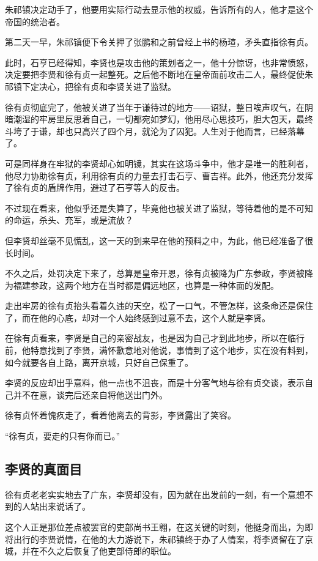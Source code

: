 \begin{multicols}{\theparacolNo}
		朱祁镇决定动手了，他要用实际行动去显示他的权威，告诉所有的人，他才是这个帝国的统治者。

		第二天一早，朱祁镇便下令关押了张鹏和之前曾经上书的杨瑄，矛头直指徐有贞。

		此时，石亨已经得知，李贤也是攻击他的策划者之一，他十分惊讶，也非常愤怒，决定要把李贤和徐有贞一起整死。之后他不断地在皇帝面前攻击二人，最终促使朱祁镇下定决心，把徐有贞和李贤关进了监狱。

		徐有贞彻底完了，他被关进了当年于谦待过的地方——诏狱，整日唉声叹气，在阴暗潮湿的牢房里反思着自己，一切都宛如梦幻，他用尽心思技巧，胆大包天，最终斗垮了于谦，却也只高兴了四个月，就沦为了囚犯。人生对于他而言，已经落幕了。

		可是同样身在牢狱的李贤却心如明镜，其实在这场斗争中，他才是唯一的胜利者，他尽力协助徐有贞，利用徐有贞的力量去打击石亨、曹吉祥。此外，他还充分发挥了徐有贞的盾牌作用，避过了石亨等人的反击。

		不过现在看来，他似乎还是失算了，毕竟他也被关进了监狱，等待着他的是不可知的命运，杀头、充军，或是流放？

		但李贤却丝毫不见慌乱，这一天的到来早在他的预料之中，为此，他已经准备了很长时间。

		不久之后，处罚决定下来了，总算是皇帝开恩，徐有贞被降为广东参政，李贤被降为福建参政，这两个地方在当时都是偏远地区，也算是一种体面的发配。

		走出牢房的徐有贞抬头看着久违的天空，松了一口气，不管怎样，这条命还是保住了，而在他的心底，却对一个人始终感到过意不去，这个人就是李贤。

		在徐有贞看来，李贤是自己的亲密战友，也是因为自己才到此地步，所以在临行前，他特意找到了李贤，满怀歉意地对他说，事情到了这个地步，实在没有料到，如今就要各自上路，离开京城，只好自己保重了。

		李贤的反应却出乎意料，他一点也不沮丧，而是十分客气地与徐有贞交谈，表示自己并不在意，谈完后还亲自将他送出门外。

		徐有贞怀着愧疚走了，看着他离去的背影，李贤露出了笑容。

		“徐有贞，要走的只有你而已。”

		\subsection{李贤的真面目}
		徐有贞老老实实地去了广东，李贤却没有，因为就在出发前的一刻，有一个意想不到的人站出来说话了。

		这个人正是那位差点被罢官的吏部尚书王翱，在这关键的时刻，他挺身而出，为即将出行的李贤说情，在他的大力游说下，朱祁镇终于办了人情案，将李贤留在了京城，并在不久之后恢复了他吏部侍郎的职位。


\end{multicols}
